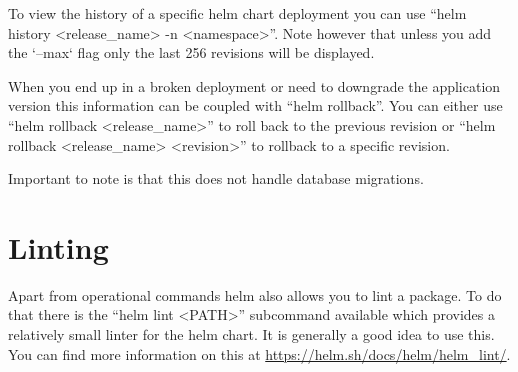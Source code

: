 \documentclass[english,10pt,a4paper]{scrreprt}
\begin{document}
To view the history of a specific helm chart deployment you can use \enquote{helm history <release\_name> -n <namespace>}.
Note however that unless you add the `--max` flag only the last 256 revisions will be displayed.

When you end up in a broken deployment or need to downgrade the application version this information can be coupled with \enquote{helm rollback}.
You can either use \enquote{helm rollback <release\_name>} to roll back to the previous revision or \enquote{helm rollback <release\_name> <revision>} to rollback to a specific revision.

Important to note is that this does not handle database migrations.

\section{Linting}
Apart from operational commands helm also allows you to lint a package.
To do that there is the \enquote{helm lint <PATH>} subcommand available which provides a relatively small linter for the helm chart.
It is generally a good idea to use this.
You can find more information on this at \url{https://helm.sh/docs/helm/helm_lint/}.

\cleardoublepage
\appendix
\printglossaries

\nocite{*}
\printbibliography[heading=bibintoc,title={Sources}]

\listoffigures
\end{document}
